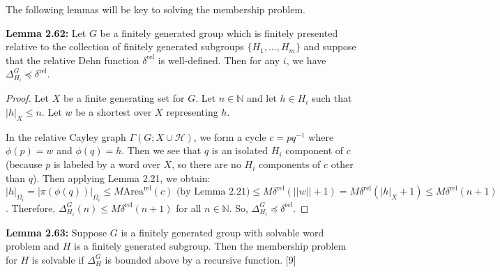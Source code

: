\documentclass[12pt]{article}
\newcommand{\vs}{\vskip10pt}
\begin{document}
	\vs 
	
	The following lemmas will be key to solving the membership problem. 
	
	\vs 
	
	\textbf{Lemma 2.62: } Let $G$ be a finitely generated group which is finitely presented relative to the collection of finitely generated subgroups $\{H_1,...,H_m\}$ and suppose that the relative Dehn function $\delta^{\text{rel}}$ is well-defined.  Then for any $i$, we have $\Delta_{H_i}^G \preccurlyeq \delta^{\text{rel}}$. 
	
	\begin{proof}
		
		Let $X$ be a finite generating set for $G$. Let $n \in \mathbb{N}$ and let $h \in H_i$ such that $\vert h \vert_X \leq n$. Let $w$ be a shortest over $X$ representing $h$. 
		
		\vs 
		
		In the relative Cayley graph $\Gamma(G; X \cup \mathcal{H})$, we form a cycle $c = pq^{-1}$ where $\phi(p) = w$ and $\phi(q) = h$. Then we see that $q$ is an isolated $H_i$ component of $c$ (because $p$ is labeled by a word over $X$, so there are no  $H_i$ components of $c$ other than $q$). Then applying Lemma 2.21, we obtain: $\vert h \vert_{\Omega_i} = \vert \pi(\phi(q)) \vert_{\Omega_i} \leq M \text{Area}^{\text{rel}}(c) \text{ (by Lemma 2.21)} \leq M \delta^{\text{rel}}( \vert \vert w \vert \vert + 1) = M \delta^{\text{rel}}( \vert h \vert_X + 1) \leq M \delta^{\text{rel}}(n + 1)$. Therefore, $\Delta_{H_i}^G (n) \leq M \delta^{\text{rel}}(n + 1)$ for all $n \in \mathbb{N}$. So,  $\Delta_{H_i}^G \preccurlyeq \delta^{\text{rel}}$.
		
	\end{proof}

	\vs 
	
	\textbf{Lemma 2.63: } Suppose $G$ is a finitely generated group with solvable word problem and $H$ is a finitely generated subgroup. Then the membership problem for $H$ is solvable if $\Delta_H^G$ is bounded above by a recursive function. [9]
	
\end{document}
